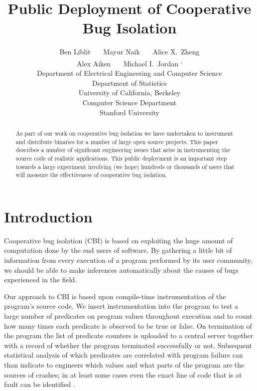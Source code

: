\documentclass[times,10pt,twocolumn]{article}
\begin{document}
\title{Public Deployment of Cooperative Bug Isolation}

\makeatletter
\newcommand*{\eecsMark}[0]{\@fnsymbol{2}}
\newcommand*{\statMark}[0]{\@fnsymbol{3}}
\newcommand*{\stanMark}[0]{\@fnsymbol{4}}
\makeatother
\newcommand*{\eecs}[0]{\textsuperscript{\eecsMark}}
\newcommand*{\stat}[0]{\textsuperscript{\statMark}}
\newcommand*{\both}[0]{\textsuperscript{\eecsMark, \statMark}}
\newcommand*{\stan}[0]{\textsuperscript{\stanMark}}

\author{
  Ben Liblit \eecs \ \ \ Mayur Naik \stan \ \ \  Alice X.\ Zheng \eecs \\
  Alex Aiken \stan \ \ \ Michael I.\ Jordan \both  \\
 \eecs Department of Electrical Engineering and Computer Science \\ 
  \stat Department of Statistics \\
 University of California, Berkeley \\
 \stan Computer Science Department \\
 Stanford University
}

\maketitle

\begin{abstract}
As part of our work on cooperative bug isolation we have undertaken to 
instrument and distribute binaries for a number of large open source projects.
This paper describes a number of significant engineering issues that arise in 
instrumenting the source code of realistic applications.  This
public deployment is an important  step towards a large experiment involving (we hope) hundreds or thousands of users that will measure the effectiveness of cooperative bug isolation.
\end{abstract}

\section{Introduction}

Cooperative bug isolation (CBI) is based on exploiting the
huge amount of computation done by the end users of software.  By
gathering a little bit of information from every execution of a
program performed by its user community, we should be able to make
inferences automatically about the causes of bugs experienced in the field.

Our approach to CBI is based upon compile-time instrumentation of the
program's source code.  We insert instrumentation into the program to
test a large number of predicates on program values throughout
execution and to count how many times each predicate is observed to be
true or false.  On termination of the program the list of predicate
counters is uploaded to a central server together with a record of
whether the program terminated successfully or not.  Subsequent
statistical analysis of which predicates are correlated with program
failure can than indicate to engineers which values and what parts of
the program are the sources of crashes; in at least some cases even
the exact line of code that is at fault can be identified \cite{}.
\end{document}
